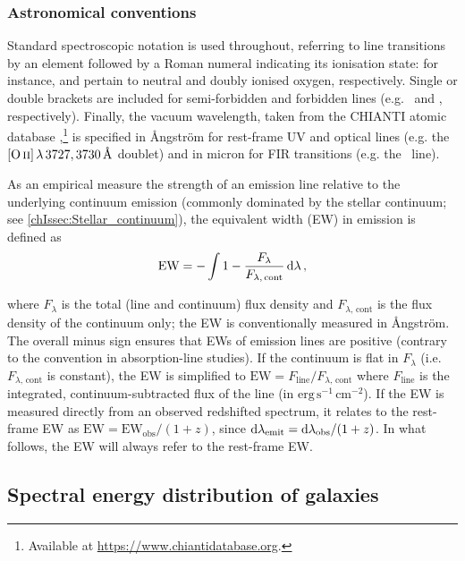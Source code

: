 \subsubsection{Astronomical conventions}
\label{chIsssec:Astronomical_conventions}

Standard spectroscopic notation is used throughout, referring to line transitions by an element followed by a Roman numeral indicating its ionisation state: for instance,  and  pertain to neutral and doubly ionised oxygen, respectively. Single or double brackets are included for semi-forbidden and forbidden lines (e.g. \CIIIs\ and \OIIIf, respectively). Finally, the vacuum wavelength, taken from the CHIANTI atomic database \citep{1997A&AS..125..149D, 2021ApJ...909...38D},\footnote{Available at \url{https://www.chiantidatabase.org}.} is specified in {\AA}ngstr{\"o}m for rest-frame UV and optical lines (e.g. the $\OII \, \lambda \, 3727, 3730 \, \Angstrom$ doublet) and in micron for FIR transitions (e.g. the \CIILam\ line).

As an empirical measure the strength of an emission line relative to the underlying continuum emission (commonly dominated by the stellar continuum; see \cref{chIssec:Stellar_continuum}), the equivalent width (EW) in emission is defined as
\begin{equation}
\label{chIeq:Equivalent_width}
\text{EW} = - \int 1 - \frac{F_\lambda}{F_{\lambda, \, \text{cont}}} \dif \lambda \, ,
\end{equation}

\noindent where $F_\lambda$ is the total (line and continuum) flux density and $F_{\lambda, \, \text{cont}}$ is the flux density of the continuum only; the EW is conventionally measured in {\AA}ngstr{\"o}m. The overall minus sign ensures that EWs of emission lines are positive (contrary to the convention in absorption-line studies). If the continuum is flat in $F_\lambda$ (i.e. $F_{\lambda, \, \text{cont}}$ is constant), the EW is simplified to $\text{EW} = F_\text{line}/F_{\lambda, \, \text{cont}}$ where $F_\text{line}$ is the integrated, continuum-subtracted flux of the line (in $\mathrm{erg \, s^{-1} \, cm^{-2}}$). If the EW is measured directly from an observed redshifted spectrum, it relates to the rest-frame EW as $\text{EW} = \text{EW}_\text{obs}/(1+z)$, since $\dif \lambda_\text{emit} = \dif \lambda_\text{obs}/(1+z)$. In what follows, the EW will always refer to the rest-frame EW.

\subsection{Spectral energy distribution of galaxies}
\label{chIssec:Spectral_energy_distribution_of_galaxies}

